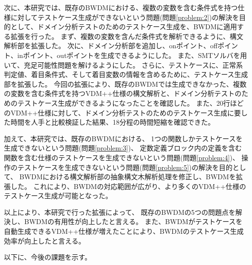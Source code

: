 \documentclass[uplatex, report, a4j, 10pt]{jsbook}
\begin{document}
次に、本研究では、既存のBWDMにおける、複数の変数を含む条件式を持つ仕様に対してテストケース生成ができないという問題(問題\ref{problem:2})の解決を目的として、ドメイン分析テストのためのテストケース生成を、BWDMに適用する拡張を行った。
まず、複数の変数を含んだ条件式を解析できるように、構文解析部を拡張した。
次に、ドメイン分析部を追加し、onポイント、offポイント、inポイント、outポイントを生成できるようにした。
また、SMTソルバを用いて、充足可能性問題を解けるようにした。
さらに、テストケースに、正常系判定値、着目条件式、そして着目変数の情報を含めるために、テストケース生成部を拡張した。
今回の拡張により、既存のBWDMでは生成できなかった、複数の変数を含む条件式を持つVDM++仕様の構文解析と、ドメイン分析テストのためのテストケース生成ができるようになったことを確認した。
また、20行ほどのVDM++仕様に対して、ドメイン分析テストのためのテストケース生成に要した時間を人手と比較検証した結果、18分程の時間短縮を確認できた。

加えて、本研究では、既存のBWDMにおける、
1つの関数しかテストケースを生成できないという問題(問題\ref{problem:3})、
定数定義ブロック内の定義を含む関数を含む仕様のテストケースを生成できないという問題(問題\ref{problem:4})、
操作のテストケースを生成できないという問題(問題\ref{problem:5})の解決を目的として、
BWDMにおける構文解析部の抽象構文木解析処理を修正し、BWDMを拡張した。
これにより、BWDMの対応範囲が広がり、より多くのVDM++仕様のテストケース生成が可能となった。

以上により、本研究で行った拡張によって、
既存のBWDMの5つの問題点を解決し、BWDMの有用性が向上したと言える。
また、BWDMがテストケースを自動生成できるVDM++仕様が増えたことにより、BWDMのテストケース生成効率が向上したと言える。

以下に、今後の課題を示す。
\end{document}
